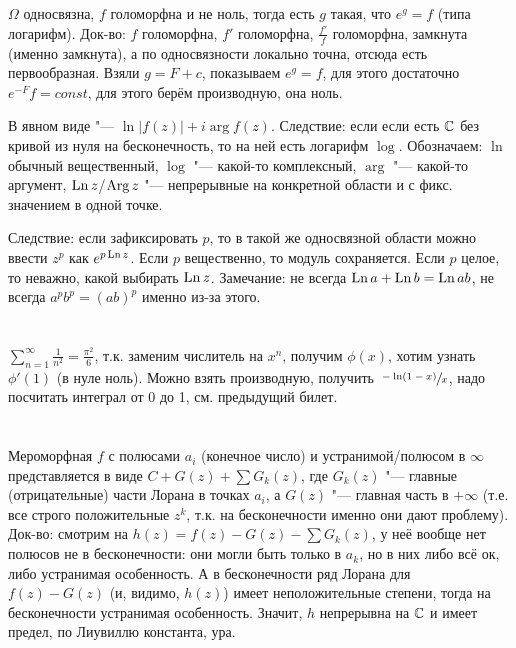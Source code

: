\section{} %
	$\Omega$ односвязна, $f$ голоморфна и не ноль, тогда есть $g$ такая, что $e^g=f$ (типа логарифм).
	Док-во: $f$ голоморфна, $f'$ голоморфна, $\frac{f'}{f}$ голоморфна, замкнута (именно замкнута),
	а по односвязности локально точна, отсюда есть первообразная.
	Взяли $g=F+c$, показываем $e^g=f$, для этого достаточно $e^{-F}f=const$,
	для этого берём производную, она ноль.

	В явном виде "--- $\ln|f(z)| + i\arg f(z)$.
	Следствие: если если есть $\mathbb{C}$ без кривой из нуля на бесконечность, то на ней есть логарифм $\log$.
	Обозначаем: $\ln$ обычный вещественный, $\log$ "--- какой-то комплексный, $\arg$ "--- какой-то аргумент,
	$\operatorname{Ln} z$/$\operatorname{Arg} z$ "--- непрерывные на конкретной области и с фикс. значением в одной точке.
	
	Следствие: если зафиксировать $p$, то в такой же односвязной области можно ввести $z^p$ как $e^{p \operatorname{Ln} z}$.
	Если $p$ вещественно, то модуль сохраняется.
	Если $p$ целое, то неважно, какой выбирать $\operatorname{Ln} z$.
	Замечание: не всегда $\operatorname{Ln} a + \operatorname{Ln} b = \operatorname{Ln} ab$, не всегда $a^pb^p=(ab)^p$ именно из-за этого.

\section{} %
	\TODO

\section{} %
	\TODO

	$\sum_{n=1}^\infty \frac{1}{n^2} = \frac{\pi^2}{6}$, т.к.
	заменим числитель на $x^n$, получим $\phi(x)$, хотим узнать $\phi'(1)$
	(в нуле ноль).
	Можно взять производную, получить $\sfrac{-\ln(1-x)}{x}$, надо посчитать
	интеграл от 0 до 1, см. предыдущий билет.

\section{} %
	Мероморфная $f$ с полюсами $a_i$ (конечное число) и устранимой/полюсом в $\infty$
	представляется в виде $C+G(z)+\sum G_k(z)$, где $G_k(z)$ "--- главные (отрицательные) части Лорана в точках $a_i$,
	а $G(z)$ "--- главная часть в $+\infty$ (т.е. все строго положительные $z^k$, т.к. на бесконечности именно они дают проблему).
	Док-во: смотрим на $h(z)=f(z)-G(z)-\sum G_k(z)$, у неё вообще нет полюсов не в бесконечности:
	они могли быть только в $a_k$, но в них либо всё ок, либо устранимая особенность.
	А в бесконечности ряд Лорана для $f(z)-G(z)$ (и, видимо, $h(z)$) имеет неположительные степени,
	тогда на бесконечности устранимая особенность.
	Значит, $h$ непрерывна на $\mathbb{C}$ и имеет предел, по Лиувиллю константа, ура.

